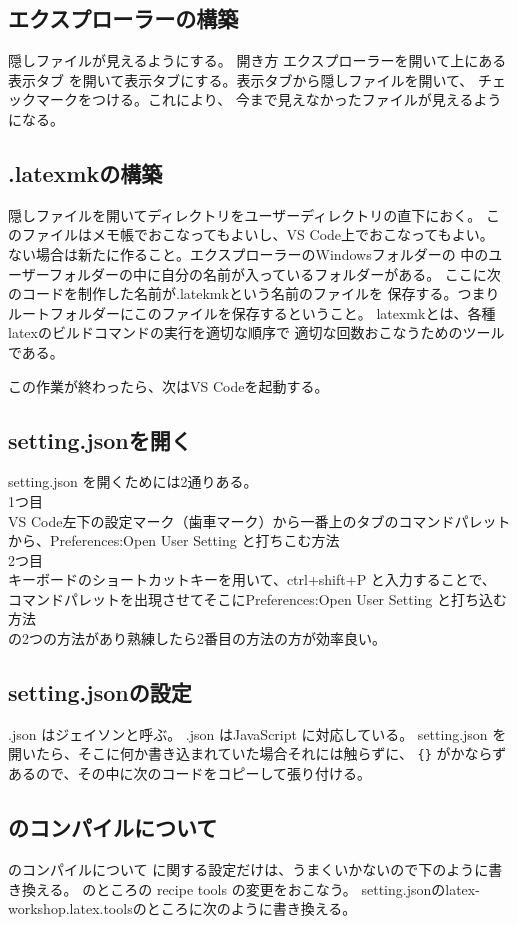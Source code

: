 \documentclass{ltjsarticle}
\begin{document}
\subsection{エクスプローラーの構築}
隠しファイルが見えるようにする。
開き方 エクスプローラーを開いて上にある表示タブ
を開いて表示タブにする。表示タブから隠しファイルを開いて、
チェックマークをつける。これにより、
今まで見えなかったファイルが見えるようになる。

\subsection{.latexmkの構築} %

\label{sub:.latexmkの構築}
隠しファイルを開いてディレクトリをユーザーディレクトリの直下におく。
このファイルはメモ帳でおこなってもよいし、VS Code上でおこなってもよい。
ない場合は新たに作ること。エクスプローラーのWindowsフォルダーの
中のユーザーフォルダーの中に自分の名前が入っているフォルダーがある。
ここに次のコードを制作した名前が.latekmkという名前のファイルを
保存する。つまりルートフォルダーにこのファイルを保存するということ。
latexmkとは、各種latexのビルドコマンドの実行を適切な順序で
適切な回数おこなうためのツールである。


この作業が終わったら、次はVS Codeを起動する。
\subsection{setting.jsonを開く}
setting.json を開くためには2通りある。\\
1つ目\\
VS Code左下の設定マーク（歯車マーク）から一番上のタブのコマンドパレット
から、Preferences:Open User Setting と打ちこむ方法\\
2つ目\\
キーボードのショートカットキーを用いて、ctrl+shift+P と入力することで、
コマンドパレットを出現させてそこにPreferences:Open User Setting
と打ち込む方法\\
の2つの方法があり熟練したら2番目の方法の方が効率良い。
\subsection{setting.jsonの設定}
.json はジェイソンと呼ぶ。
.json はJavaScript に対応している。
setting.json を開いたら、そこに何か書き込まれていた場合それには触らずに、
\verb|{}|
がかならずあるので、その中に次のコードをコピーして張り付ける。

\subsection{\pLaTeX のコンパイルについて}
\pLaTeX のコンパイルについて
\pLaTeX に関する設定だけは、うまくいかないので下のように書き換える。
\pLaTeX  のところの
recipe tools の変更をおこなう。
setting.jsonのlatex-workshop.latex.toolsのところに次のように書き換える。
\end{document}
